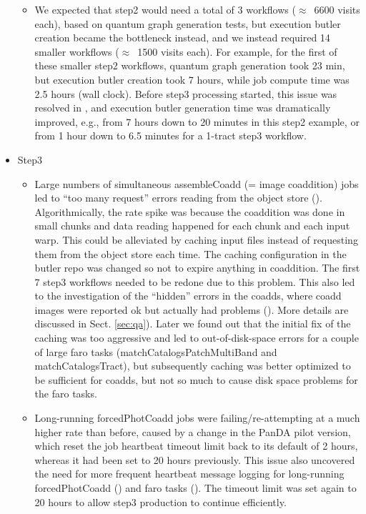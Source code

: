 \begin{itemize}
\begin{itemize}
 \item
 We expected that step2 would need a total of 3 workflows ($\approx$~6600 visits each), based on quantum graph generation tests, but execution butler creation became the bottleneck instead, and we instead required 14 smaller workflows ($\approx$~1500 visits each).
 For example, for the first of these smaller step2 workflows, quantum graph generation took 23 min, but execution butler creation took 7 hours, while job compute time was 2.5 hours (wall clock).
 Before step3 processing started, this issue was resolved in , and execution butler generation time was dramatically improved, e.g., from 7 hours down to 20 minutes in this step2 example, or from 1 hour down to 6.5 minutes for a 1-tract step3 workflow.

\end{itemize} %

\item Step3
\begin{itemize}

  \item
  Large numbers of simultaneous assembleCoadd (= image coaddition) jobs led to ``too many request'' errors reading from the object store ().
  Algorithmically, the rate spike was because the coaddition was done in small chunks and data reading happened for each chunk and each input warp.
  This could be alleviated by caching input files instead of requesting them from the object store each time.
  The caching configuration in the butler repo was changed so not to expire anything in coaddition.
  The first 7 step3 workflows needed to be redone due to this problem.
  This also led to the investigation of the ``hidden'' errors in the coadds, where coadd images were reported ok but actually had problems ().
  More details are discussed in Sect. \ref{sec:qa}).
  Later we found out that the initial fix of the caching was too aggressive and led to out-of-disk-space errors for a couple of large faro tasks (matchCatalogsPatchMultiBand and matchCatalogsTract), but subsequently caching was better optimized to be sufficient for coadds, but not so much to cause disk space problems for the faro tasks.

  \item
  Long-running forcedPhotCoadd jobs were failing/re-attempting at a much higher rate than before, caused by a change in the PanDA pilot version, which reset the job heartbeat timeout limit back to its default of 2 hours, whereas it had been set to 20 hours previously.
  This issue also uncovered the need for more frequent heartbeat message logging for long-running forcedPhotCoadd () and faro tasks ().
  The timeout limit was set again to 20 hours to allow step3 production to continue efficiently.


\end{itemize}
\end{itemize}
